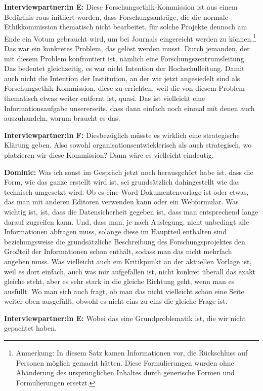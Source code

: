 \documentclass[a4paper,12pt,twoside]{scrreprt}
\begin{document}
\textbf{Interviewpartner:in E:} Diese Forschungsethik-Kommission ist aus einem Bedürfnis raus initiiert worden, dass Forschungsanträge, die die normale Ethikkommission thematisch nicht bearbeitet, für solche Projekte dennoch am Ende ein Votum gebraucht wird, um bei Journals eingereicht werden zu können.\footnote{Anmerkung: In diesem Satz kamen Informationen vor, die Rückschluss auf Personen möglich gemacht hätten. Diese Formulierungen wurden ohne Abänderung des ursprünglichen Inhaltes durch generische Formen und Formulierungen ersetzt.} Das war ein konkretes Problem, das gelöst werden musst. Durch jemanden, der mit diesem Problem konfrontiert ist, nämlich eine Forschungszentrumsleitung. Das bedeutet gleichzeitig, es war nicht Intention der Hochschulleitung. Damit auch nicht die Intention der Institution, an der wir jetzt angesiedelt sind als Forschungsethik-Kommission, diese zu errichten, weil die von diesem Problem thematisch etwas weiter entfernt ist, quasi. Das ist vielleicht eine Informationsaufgabe unsererseits, dass dann einfach noch einmal mit denen auch auszuhandeln, warum braucht es das.

\textbf{Interviewpartner:in F:} Diesbezüglich müsste es wirklich eine strategische Klärung geben. Also sowohl organisationsentwicklerisch als auch strategisch, wo platzieren wir diese Kommission? Dann wäre es vielleicht eindeutig.

\textbf{Dominic:} Was ich sonst im Gespräch jetzt noch herausgehört habe ist, dass die Form, wie das ganze erstellt wird ist, sei grundsätzlich dahingestellt wie das technisch umgesetzt wird. Ob es eine Word-Dokumentenvorlage ist oder etwas, das man mit anderen Editoren verwenden kann oder ein Webformular. Was wichtig ist, ist, dass die Datensicherheit gegeben ist, dass man entsprechend lange darauf zugreifen kann. Und, dass man, je nach Auslegung, nicht unbedingt alle Informationen abfragen muss, solange diese im Hauptteil enthalten sind beziehungsweise die grundsätzliche Beschreibung des Forschungsprojektes den Großteil der Informationen schon enthält, sodass man das nicht mehrfach angeben muss. Was vielleicht auch ein Kritikpunkt an der aktuellen Vorlage ist, weil es dort einfach, auch was mir aufgefallen ist, nicht konkret überall das exakt gleiche steht, aber es sehr stark in die gleiche Richtung geht, wenn man es ausfüllt. Wo man sich auch fragt, ob man das nicht vielleicht schon eine Seite weiter oben ausgefüllt, obwohl es nicht eins zu eins die gleiche Frage ist.

\textbf{Interviewpartner:in E:} Wobei das eine Grundproblematik ist, die wir nicht gepachtet haben.
\end{document}

